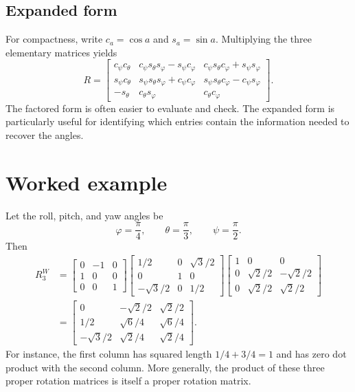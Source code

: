 \subsection{Expanded form}
For compactness, write $c_a=\cos a$ and $s_a=\sin a$. Multiplying the three
elementary matrices yields
\begin{equation}
 R=\begin{bmatrix}
 c_\psi c_\theta & c_\psi s_\theta s_\varphi-s_\psi c_\varphi & c_\psi s_\theta c_\varphi+s_\psi s_\varphi\\
 s_\psi c_\theta & s_\psi s_\theta s_\varphi+c_\psi c_\varphi & s_\psi s_\theta c_\varphi-c_\psi s_\varphi\\
 -s_\theta & c_\theta s_\varphi & c_\theta c_\varphi
 \end{bmatrix}.
 \label{eq:l04-expanded}
\end{equation}
The factored form is often easier to evaluate and check. The expanded form is
particularly useful for identifying which entries contain the information
needed to recover the angles.

\section{Worked example}
Let the roll, pitch, and yaw angles be
\[
 \varphi=\frac{\pi}{4},\qquad \theta=\frac{\pi}{3},\qquad \psi=\frac{\pi}{2}.
\]
Then
\begin{align}
 R_3^W
 &=\begin{bmatrix}0&-1&0\\1&0&0\\0&0&1\end{bmatrix}
 \begin{bmatrix}1/2&0&\sqrt3/2\\0&1&0\\-\sqrt3/2&0&1/2\end{bmatrix}
 \begin{bmatrix}1&0&0\\0&\sqrt2/2&-\sqrt2/2\\0&\sqrt2/2&\sqrt2/2\end{bmatrix}\\
 &=\begin{bmatrix}
 0&-\sqrt2/2&\sqrt2/2\\
 1/2&\sqrt6/4&\sqrt6/4\\
 -\sqrt3/2&\sqrt2/4&\sqrt2/4
 \end{bmatrix}.
 \label{eq:l04-example}
\end{align}
For instance, the first column has squared length $1/4+3/4=1$ and has zero
dot product with the second column. More generally, the product of these
three proper rotation matrices is itself a proper rotation matrix.

